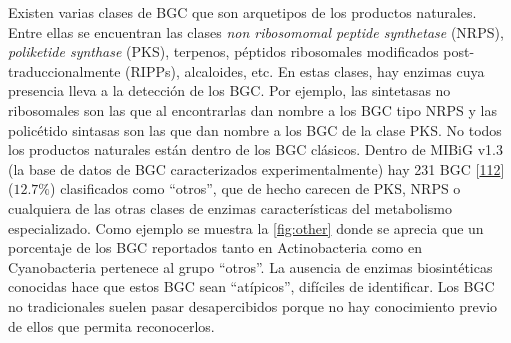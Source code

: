\documentclass[12pt,twoside]{reedthesis}
\begin{document}
  Existen varias clases de BGC que son arquetipos de los productos
  naturales. Entre ellas se encuentran las clases \emph{non ribosomomal
  peptide synthetase} (NRPS), \emph{poliketide synthase} (PKS), terpenos,
  péptidos ribosomales modificados post-traduccionalmente (RIPPs),
  alcaloides, etc. En estas clases, hay enzimas cuya presencia lleva a la
  detección de los BGC. Por ejemplo, las sintetasas no ribosomales son las
  que al encontrarlas dan nombre a los BGC tipo NRPS y las policétido
  sintasas son las que dan nombre a los BGC de la clase PKS. No todos los
  productos naturales están dentro de los BGC clásicos. Dentro de MIBiG
  v1.3 (la base de datos de BGC caracterizados experimentalmente) hay 231
  BGC {[}\protect\hyperlink{ref-medema_minimum_2015}{112}{]} (\(12.7\%\))
  clasificados como ``otros'', que de hecho carecen de PKS, NRPS o
  cualquiera de las otras clases de enzimas características del
  metabolismo especializado. Como ejemplo se muestra la
  \autoref{fig:other} donde se aprecia que un porcentaje de los BGC
  reportados tanto en Actinobacteria como en Cyanobacteria pertenece al
  grupo ``otros''. La ausencia de enzimas biosintéticas conocidas hace que
  estos BGC sean ``atípicos'', difíciles de identificar. Los BGC no
  tradicionales suelen pasar desapercibidos porque no hay conocimiento
  previo de ellos que permita reconocerlos.
  
\end{document}

